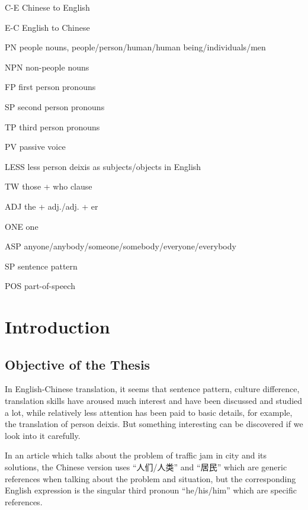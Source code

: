 \documentclass[degree=bachelor,language=english]{thuthesis}
\begin{document}
\begin{denotation}[4em]
\item[C-E] Chinese to English
\item[E-C] English to Chinese
\item[PN] people nouns, people/person/human/human being/individuals/men
\item[NPN] non-people nouns
\item[FP] first person pronouns
\item[SP] second person pronouns
\item[TP] third person pronouns
\item[PV] passive voice
\item[LESS] less person deixis as subjects/objects in English
\item[TW] those + who clause
\item[ADJ] the + adj./adj. + er
\item[ONE] one
\item[ASP] anyone/anybody/someone/somebody/everyone/everybody
\item[SP] sentence pattern
\item[POS] part-of-speech

\end{denotation}



\mainmatter

\chapter{Introduction}

\section{Objective of the Thesis}

In English-Chinese translation, it seems that sentence pattern, culture difference, translation skills have aroused much interest and have been discussed and studied a lot, while relatively less attention has been paid to basic details, for example, the translation of person deixis.
But something interesting can be discovered if we look into it carefully.

In an article which talks about the problem of traffic jam in city and its solutions, the Chinese version uses “人们/人类” and “居民” which are generic references when talking about the problem and situation, but the corresponding English expression is the singular third pronoun “he/his/him” which are specific references.
\end{document}

